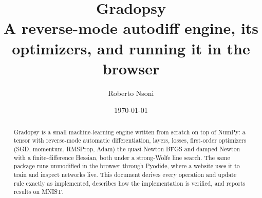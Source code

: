 \documentclass[11pt]{article}
\title{\textbf{Gradopsy}\\[2pt]\large A reverse-mode autodiff engine, its optimizers, and running it in the browser}
\author{Roberto Nsoni}
\date{\today}
\begin{document}
\maketitle

\begin{abstract}
Gradopsy is a small machine-learning engine written from scratch on top of NumPy: a tensor with
reverse-mode automatic differentiation, layers, losses, first-order optimizers (SGD, momentum,
RMSProp, Adam) the quasi-Newton BFGS and damped Newton with a finite-difference Hessian, both
under a strong-Wolfe line search. The same package runs unmodified in the browser through Pyodide,
where a website uses it to train and inspect networks live. This document derives every operation
and update rule exactly as implemented, describes how the implementation is verified, and reports
results on MNIST.
\end{abstract}













\end{document}
